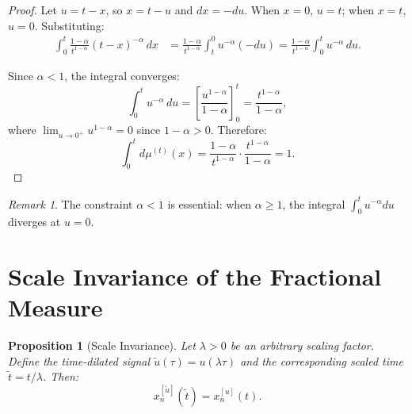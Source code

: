 \documentclass{article}
\theoremstyle{plain}
\newtheorem{proposition}[theorem]{Proposition}
\theoremstyle{definition}
\theoremstyle{remark}
\newtheorem{remark}[theorem]{Remark}
\begin{document}
\begin{proof}
	Let $u = t - x$, so $x = t - u$ and $dx = -du$.
	When $x = 0$, $u = t$; when $x = t$, $u = 0$.
	Substituting:
	\begin{align}
		\int_0^t \frac{1-\alpha}{t^{1-\alpha}}(t-x)^{-\alpha}\,dx
		&= \frac{1-\alpha}{t^{1-\alpha}} \int_t^0 u^{-\alpha}(-du)
		= \frac{1-\alpha}{t^{1-\alpha}} \int_0^t u^{-\alpha}\,du.
	\end{align}
	
	Since $\alpha < 1$, the integral converges:
	\begin{equation}
		\int_0^t u^{-\alpha} \, du = \left[ \frac{u^{1-\alpha}}{1-\alpha} \right]_0^t = \frac{t^{1-\alpha}}{1-\alpha},
	\end{equation}
	where $\lim_{u \to 0^+} u^{1-\alpha} = 0$ since $1 - \alpha > 0$. Therefore:
	\begin{equation}
		\int_0^t d\mu^{(t)}(x) = \frac{1-\alpha}{t^{1-\alpha}} \cdot \frac{t^{1-\alpha}}{1-\alpha} = 1.
	\end{equation}
\end{proof}

\begin{remark}
	The constraint $\alpha < 1$ is essential: when $\alpha \geq 1$, the integral $\int_0^t u^{-\alpha} du$ diverges at $u = 0$.
\end{remark}

\section{Scale Invariance of the Fractional Measure}
\label{app:scale_invariance}

\begin{proposition}[Scale Invariance]
	\label{prop:scale_invariance}
	Let $\lambda > 0$ be an arbitrary scaling factor. Define the time-dilated signal $\tilde{u}(\tau) = u(\lambda \tau)$ and the corresponding scaled time $\tilde{t} = t/\lambda$. Then:
	\begin{equation}
		x_n^{[\tilde{u}]}(\tilde{t}) = x_n^{[u]}(t).
	\end{equation}
\end{proposition}
\end{document}
